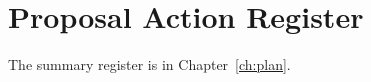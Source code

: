 \chapter{Proposal Action Register}
\label{app:actions}
The summary register is in Chapter~\ref{ch:plan}. 
